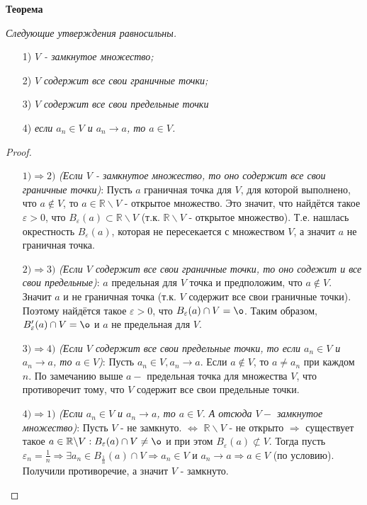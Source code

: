 \documentclass[12pt]{article}
\theoremstyle{definition}
\begin{document}
\textbf{Теорема}

\textit{Следующие утверждения равносильны.}

\begin{itemize}
    \item[1)] \textit{$V$ - замкнутое множество;}
    \item[2)] \textit{$V$ содержит все свои граничные точки;}
    \item[3)] \textit{$V$ содержит все свои предельные точки}
    \item[4)] \textit{если $a_n\in V$ и $a_n\rightarrow a$, то $a\in V$.}
\end{itemize}

\begin{proof}
 
\begin{itemize}
    \item[$1) \Rightarrow2)$]\textit{(Если $V$ - замкнутое множество, то оно содержит все свои граничные точки)}: \newline Пусть $a$ граничная точка для $V$, для которой выполнено, что $a\not\in V$, то $a\in\mathbb{R}\backslash V$ - открытое множество. Это значит, что найдётся такое $\varepsilon > 0$, что $B_\varepsilon(a)\subset \mathbb{R}\backslash V$ (т.к. $\mathbb{R}\backslash V$ - открытое множество). Т.е. нашлась окрестность $B_\varepsilon(a)$, которая не пересекается с множеством $V$, а значит $a$ не граничная точка.
    \item[$2) \Rightarrow3)$] \textit{(Если $V$ содержит все свои граничные точки, то оно содежит и все свои предельные)}:  $a$ предельная для $V$ точка и предположим, что $a \not\in V$. Значит $a$ и не граничная точка (т.к. $V$ содержит все свои граничные точки). Поэтому найдётся такое $\varepsilon > 0$, что $B_\varepsilon(a)\cap V = \o$. Таким образом, $B'_\varepsilon(a)\cap V=\o$ и $a$ не предельная для $V$.
    \item[$3) \Rightarrow4)$] \textit{(Если $V$ содержит все свои предельные точки, то если $a_n\in V$ и $a_n\rightarrow a$, то $a\in V$)}: \newline Пусть $a_n\in V, a_n\rightarrow a$. Если $a\not\in V$, то $a\neq a_n$ при каждом $n$. По замечанию выше $a - $ предельная точка для множества $V$, что противоречит тому, что $V$ содержит все свои предельные точки.
    \item[$4) \Rightarrow1)$] \textit{(Если $a_n\in V$ и $a_n\rightarrow a$, то $a\in V$. А отсюда $V - $ замкнутое множество)}: \newline Пусть $V$ - не замкнуто. $\Leftrightarrow$ $\mathbb{R}\backslash V$ - не открыто $\Rightarrow$ существует такое $a\in \mathbb{R}\backslash V: B_\varepsilon(a) \cap V \neq \o$ и при этом $B_\varepsilon(a)\not\subset V$. Тогда пусть $\varepsilon_n = \frac{1}{n} \Rightarrow \exists a_n\in B_{\frac{1}{n}}(a) \cap V \Rightarrow a_n\in V$ и $a_n\rightarrow a \Rightarrow a\in V$ (по условию). Получили противоречие, а значит $V$ - замкнуто.
\end{itemize}
\end{proof}
\end{document}
